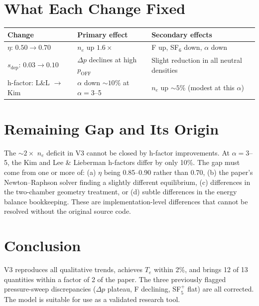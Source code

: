 \documentclass[11pt,a4paper]{article}
\begin{document}
\section{What Each Change Fixed}

\begin{table}[H]
\centering
\begin{tabular}{lll}
\toprule
\textbf{Change} & \textbf{Primary effect} & \textbf{Secondary effects} \\
\midrule
$\eta$: $0.50 \to 0.70$ & $n_e$ up $1.6\times$ & F up, SF$_6$ down, $\alpha$ down \\
$s_\text{dep}$: $0.03 \to 0.10$ & $\Delta p$ declines at high $p_\text{OFF}$ & Slight reduction in all neutral densities \\
h-factor: L\&L $\to$ Kim & $\alpha$ down ${\sim}10\%$ at $\alpha = 3$--5 & $n_e$ up ${\sim}5\%$ (modest at this $\alpha$) \\
\bottomrule
\end{tabular}
\end{table}

\section{Remaining Gap and Its Origin}

The ${\sim}2\times$ $n_e$ deficit in V3 cannot be closed by h-factor improvements. At $\alpha = 3$--5, the Kim and Lee \& Lieberman h-factors differ by only 10\%. The gap must come from one or more of: (a) $\eta$ being 0.85--0.90 rather than 0.70, (b) the paper's Newton--Raphson solver finding a slightly different equilibrium, (c) differences in the two-chamber geometry treatment, or (d) subtle differences in the energy balance bookkeeping. These are implementation-level differences that cannot be resolved without the original source code.

\section{Conclusion}

V3 reproduces all qualitative trends, achieves $T_e$ within 2\%, and brings 12 of 13 quantities within a factor of 2 of the paper. The three previously flagged pressure-sweep discrepancies ($\Delta p$ plateau, F declining, SF$_5^+$ flat) are all corrected. The model is suitable for use as a validated research tool.
\end{document}
